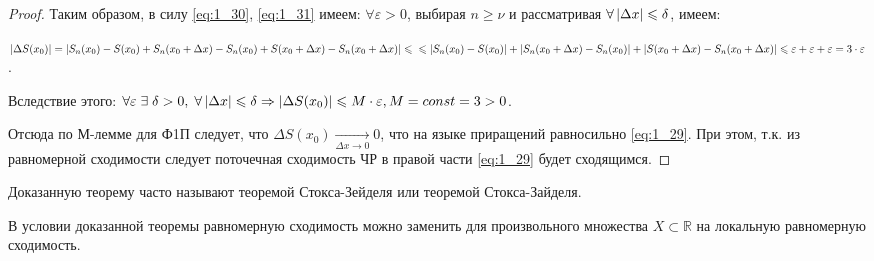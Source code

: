 \begin{proof}
	Таким образом,  в силу \eqref{eq:1_30}, \eqref{eq:1_31} имеем: $\forall \varepsilon > 0$, выбирая $n \geqslant \nu$ и рассматривая $\forall \left\lvert \Delta x \right\rvert	 \leqslant \delta$, имеем:

	$\left\lvert \Delta S(x_0) \right\rvert = \left\lvert S_n(x_0) - S(x_0) + S_n(x_0 + \Delta x) - S_n(x_0) + S (x_0 + \Delta x) - S_n(x_0 + \Delta x) \right\rvert \leqslant \\  \leqslant \left\lvert S_n(x_0) - S(x_0) \right\rvert + \left\lvert S_n(x_0 + \Delta x) - S_n(x_0) \right\rvert + \left\lvert S(x_0 + \Delta x	) - S_n(x_0 + \Delta x) \right\rvert \leqslant \varepsilon + \varepsilon + \varepsilon = 3 \cdot \varepsilon$.

    Вследствие этого:
	$\forall \varepsilon \; \exists \; \delta > 0, \; \forall \left\lvert \Delta x \right\rvert \leqslant \delta \Rightarrow \left\lvert \Delta S(x_0) \right\rvert \leqslant M \cdot \varepsilon, M = const = 3 > 0$.

	Отсюда по М-лемме для Ф1П следует, что $\Delta S(x_0) \underset{\Delta x \to 0}{\to} 0$, что на языке приращений равносильно \eqref{eq:1_29}. При этом, т.к. из равномерной сходимости следует поточечная сходимость ЧР в правой части \eqref{eq:1_29} будет сходящимся.
\end{proof}

\begin{notes}
	\item Доказанную теорему часто называют теоремой Стокса-Зейделя или теоремой Стокса-Зайделя.
	\item В условии доказанной теоремы равномерную сходимость можно заменить для произвольного множества $ X \subset \mathbb{R}$ на локальную равномерную сходимость.
\end{notes}
